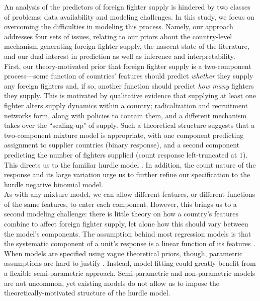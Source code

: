 \documentclass[12pt]{article}
\begin{document}
An analysis of the predictors of foreign fighter supply is hindered by two classes of problems: data availability and modeling challenges. In this study, we focus on overcoming the difficulties in modeling this process. Namely, our approach addresses four sets of issues, relating to our priors about the country-level mechanism generating foreign fighter supply, the nascent state of the literature, and our dual interest in prediction as well as inference and interpretability. \\ 

First, our theory-motivated prior that foreign fighter supply is a two-component process---some function of countries' features should predict \textit{whether} they supply any foreign fighters and, if so, another function should predict \textit{how many} fighters they supply. This is motivated by qualitative evidence that supplying at least one fighter alters supply dynamics within a country; radicalization and recruitment networks form, along with policies to contain them, and a different mechanism takes over the ``scaling-up" of supply. Such a theoretical structure suggests that a two-component mixture model is appropriate, with one component predicting assignment to supplier countries (binary response), and a second component predicting the number of fighters supplied (count response left-truncated at $1$). This directs us to the familiar hurdle model \citep{Mullahy1986}. In addition, the count nature of the response and its large variation urge us to further refine our specification to the hurdle negative binomial model.  \\

As with any mixture model, we can allow different features, or different functions of the same features, to enter each component. However, this brings us to a second modeling challenge: there is little theory on how a country's features combine to affect foreign fighter supply, let alone how this should vary between the model's components. The assumption behind most regression models is that the systematic component of a unit's response is a linear function of its features \citep{King1989a}. When models are specified using vague theoretical priors, though, parametric assumptions are hard to justify \citep{Ho2007}. Instead, model-fitting could greatly benefit from a flexible semi-parametric approach. Semi-parametric and non-parametric models are not uncommon, yet existing models do not allow us to impose the theoretically-motivated structure of the hurdle model. \\
\end{document}
